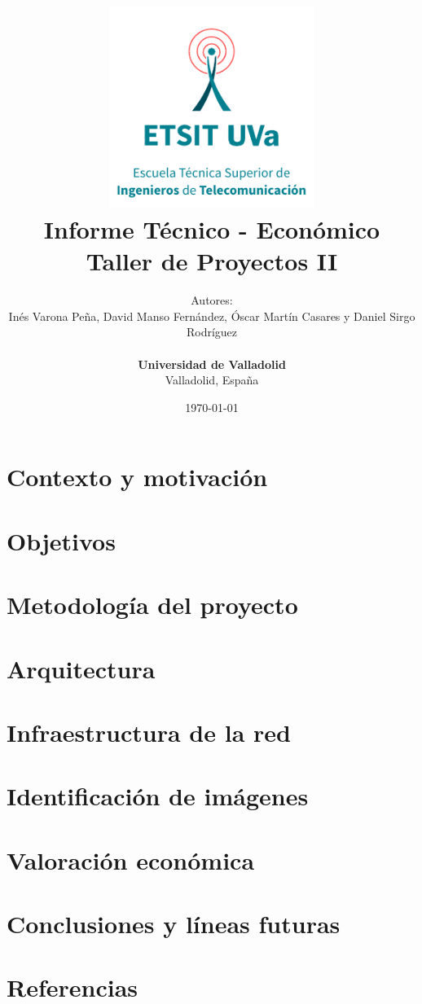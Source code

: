 \documentclass[10pt,a4paper,titlepage]{report}
\title{
\includegraphics[width=0.5\textwidth]{Imagenes/uva_color.pdf}  \\
\vspace*{1in}
\textbf{Informe Técnico - Económico}\\
\vspace*{0.5in}
\textbf{Taller de Proyectos II}}
\author{Autores:\\
Inés Varona Peña, David Manso Fernández, Óscar Martín Casares y Daniel Sirgo Rodríguez\\
		\vspace*{0.5in} \\
        \textbf{Universidad de Valladolid}\\
        Valladolid, España
       } \date{\today}
\begin{document}
\maketitle
\tableofcontents
\listoffigures
\listoftables

\chapter{Contexto y motivación}


\chapter{Objetivos}

\chapter{Metodología del proyecto}


\chapter{Arquitectura}
\chapter{Infraestructura de la red}
\chapter{Identificación de imágenes}
\chapter{Valoración económica}
\chapter{Conclusiones y líneas futuras}
\chapter{Referencias}
\end{document}
